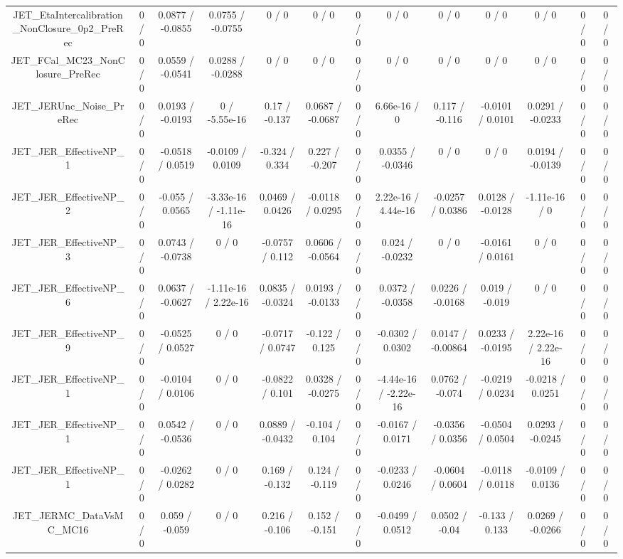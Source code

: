 \documentclass[10pt]{article}
\begin{document}
\begin{table}[htbp]
\begin{center}
\begin{tabular}{|c|c|c|c|c|c|c|c|c|c|c|c|c|}
  JET_EtaIntercalibration_NonClosure_0p2_PreRec & 0 / 0 & 0.0877 / -0.0855 & 0.0755 / -0.0755 & 0 / 0 & 0 / 0 & 0 / 0 & 0 / 0 & 0 / 0 & 0 / 0 & 0 / 0 & 0 / 0 & 0 / 0 \\ 
  JET_FCal_MC23_NonClosure_PreRec & 0 / 0 & 0.0559 / -0.0541 & 0.0288 / -0.0288 & 0 / 0 & 0 / 0 & 0 / 0 & 0 / 0 & 0 / 0 & 0 / 0 & 0 / 0 & 0 / 0 & 0 / 0 \\ 
  JET_JERUnc_Noise_PreRec & 0 / 0 & 0.0193 / -0.0193 & 0 / -5.55e-16 & 0.17 / -0.137 & 0.0687 / -0.0687 & 0 / 0 & 6.66e-16 / 0 & 0.117 / -0.116 & -0.0101 / 0.0101 & 0.0291 / -0.0233 & 0 / 0 & 0 / 0 \\ 
  JET_JER_EffectiveNP_1 & 0 / 0 & -0.0518 / 0.0519 & -0.0109 / 0.0109 & -0.324 / 0.334 & 0.227 / -0.207 & 0 / 0 & 0.0355 / -0.0346 & 0 / 0 & 0 / 0 & 0.0194 / -0.0139 & 0 / 0 & 0 / 0 \\ 
  JET_JER_EffectiveNP_2 & 0 / 0 & -0.055 / 0.0565 & -3.33e-16 / -1.11e-16 & 0.0469 / 0.0426 & -0.0118 / 0.0295 & 0 / 0 & 2.22e-16 / 4.44e-16 & -0.0257 / 0.0386 & 0.0128 / -0.0128 & -1.11e-16 / 0 & 0 / 0 & 0 / 0 \\ 
  JET_JER_EffectiveNP_3 & 0 / 0 & 0.0743 / -0.0738 & 0 / 0 & -0.0757 / 0.112 & 0.0606 / -0.0564 & 0 / 0 & 0.024 / -0.0232 & 0 / 0 & -0.0161 / 0.0161 & 0 / 0 & 0 / 0 & 0 / 0 \\ 
  JET_JER_EffectiveNP_6 & 0 / 0 & 0.0637 / -0.0627 & -1.11e-16 / 2.22e-16 & 0.0835 / -0.0324 & 0.0193 / -0.0133 & 0 / 0 & 0.0372 / -0.0358 & 0.0226 / -0.0168 & 0.019 / -0.019 & 0 / 0 & 0 / 0 & 0 / 0 \\ 
  JET_JER_EffectiveNP_9 & 0 / 0 & -0.0525 / 0.0527 & 0 / 0 & -0.0717 / 0.0747 & -0.122 / 0.125 & 0 / 0 & -0.0302 / 0.0302 & 0.0147 / -0.00864 & 0.0233 / -0.0195 & 2.22e-16 / 2.22e-16 & 0 / 0 & 0 / 0 \\ 
  JET_JER_EffectiveNP_1 & 0 / 0 & -0.0104 / 0.0106 & 0 / 0 & -0.0822 / 0.101 & 0.0328 / -0.0275 & 0 / 0 & -4.44e-16 / -2.22e-16 & 0.0762 / -0.074 & -0.0219 / 0.0234 & -0.0218 / 0.0251 & 0 / 0 & 0 / 0 \\ 
  JET_JER_EffectiveNP_1 & 0 / 0 & 0.0542 / -0.0536 & 0 / 0 & 0.0889 / -0.0432 & -0.104 / 0.104 & 0 / 0 & -0.0167 / 0.0171 & -0.0356 / 0.0356 & -0.0504 / 0.0504 & 0.0293 / -0.0245 & 0 / 0 & 0 / 0 \\ 
  JET_JER_EffectiveNP_1 & 0 / 0 & -0.0262 / 0.0282 & 0 / 0 & 0.169 / -0.132 & 0.124 / -0.119 & 0 / 0 & -0.0233 / 0.0246 & -0.0604 / 0.0604 & -0.0118 / 0.0118 & -0.0109 / 0.0136 & 0 / 0 & 0 / 0 \\ 
  JET_JERMC_DataVsMC_MC16 & 0 / 0 & 0.059 / -0.059 & 0 / 0 & 0.216 / -0.106 & 0.152 / -0.151 & 0 / 0 & -0.0499 / 0.0512 & 0.0502 / -0.04 & -0.133 / 0.133 & 0.0269 / -0.0266 & 0 / 0 & 0 / 0 \\ 

\end{tabular}
\end{center}
\end{table}
\end{document}
